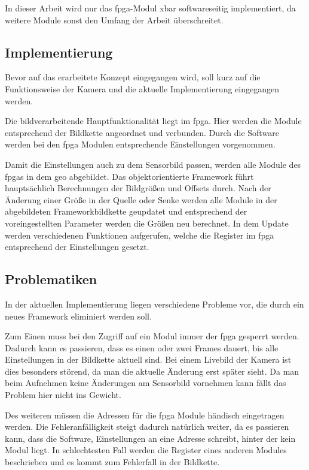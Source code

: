 In dieser Arbeit wird nur das \ac{fpga}-Modul \ac{xbar} softwareseitig implementiert, da weitere Module sonst den Umfang der Arbeit überschreitet.

\subsection{Implementierung}
Bevor auf das erarbeitete Konzept eingegangen wird, soll kurz auf die Funktionsweise der Kamera und die aktuelle Implementierung eingegangen werden.

Die bildverarbeitende Hauptfunktionalität liegt im \ac{fpga}. Hier werden die Module entsprechend der Bildkette angeordnet und verbunden. Durch die Software werden bei den \ac{fpga} Modulen entsprechende Einstellungen vorgenommen.

Damit die Einstellungen auch zu dem Sensorbild passen, werden alle Module des \ac{fpga}s in dem \ac{geo} abgebildet. Das objektorientierte Framework führt hauptsächlich Berechnungen der Bildgrößen und Offsets durch. Nach der Änderung einer Größe in der Quelle oder Senke werden alle Module in der abgebildeten Frameworkbildkette geupdatet und entsprechend der voreingestellten Parameter werden die Größen neu berechnet. In dem Update werden verschiedenen Funktionen aufgerufen, welche die Register im \ac{fpga} entsprechend der Einstellungen gesetzt.

\subsection{Problematiken}\label{sec:prob}
In der aktuellen Implementierung liegen verschiedene Probleme vor, die durch ein neues Framework eliminiert werden soll.

Zum Einen muss bei den Zugriff auf ein Modul immer der \ac{fpga} gesperrt werden. Dadurch kann es passieren, dass es einen oder zwei Frames dauert, bis alle Einstellungen in der Bildkette aktuell sind. Bei einem Livebild der Kamera ist dies besonders störend, da man die aktuelle Änderung erst später sieht. Da man beim Aufnehmen keine Änderungen am Sensorbild vornehmen kann fällt das Problem hier nicht ins Gewicht.

Des weiteren müssen die Adressen für die \ac{fpga} Module händisch eingetragen werden. Die Fehleranfälligkeit steigt dadurch natürlich weiter, da es passieren kann, dass die Software, Einstellungen an eine Adresse schreibt, hinter der kein Modul liegt. In schlechtesten Fall werden die Register eines anderen Modules beschrieben und es kommt zum Fehlerfall in der Bildkette.


